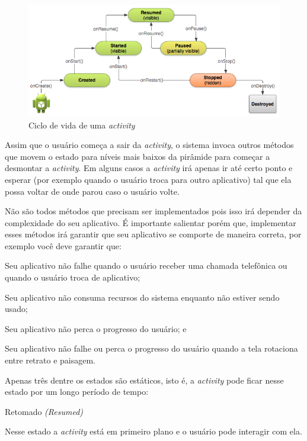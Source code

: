\documentclass[a4paper,12pt,brazil,oneside]{book}
\begin{document}
\begin{figure}[H]
  \centering
  \includegraphics[width=1\textwidth]{figuras/design/basic-lifecycle.png}
  \caption{Ciclo de vida de uma \emph{activity} }
  \label{fig:e2}
\end{figure}

Assim que o usuário começa a sair da \emph{activity}, o sistema invoca outros métodos que movem o estado para níveis mais baixos da pirâmide para começar a desmontar a \emph{activity}. Em alguns casos a \emph{activity} irá apenas ir até certo ponto e esperar (por exemplo quando o usuário troca para outro aplicativo) tal que ela possa voltar de onde parou caso o usuário volte. 

 Não são todos métodos que precisam ser implementados pois isso irá depender da complexidade do seu aplicativo. É importante salientar porém que, implementar esses métodos irá garantir que seu aplicativo se comporte de maneira correta, por exemplo você deve garantir que:
 \bi
 \item Seu aplicativo não falhe quando o usuário receber uma chamada telefônica ou quando o usuário troca de aplicativo;
 \item Seu aplicativo não consuma recursos do sistema enquanto não estiver sendo usado;
 \item Seu aplicativo não perca o progresso do usuário; e
 \item Seu aplicativo não falhe ou perca o progresso do usuário quando a tela rotaciona entre retrato e paisagem.
\ei

Apenas três dentre os estados são estáticos, isto é, a \emph{activity} pode ficar nesse estado por um longo período de tempo:


Retomado \emph{(Resumed)}
	
\hspace*{5mm} Nesse estado a \emph{activity} está em primeiro plano e o usuário pode interagir com ela.
	
\end{document}
